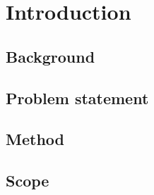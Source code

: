 \chapter{Introduction}\label{chap:intro}

\section{Background}

\section{Problem statement}

\section{Method}

\section{Scope}

